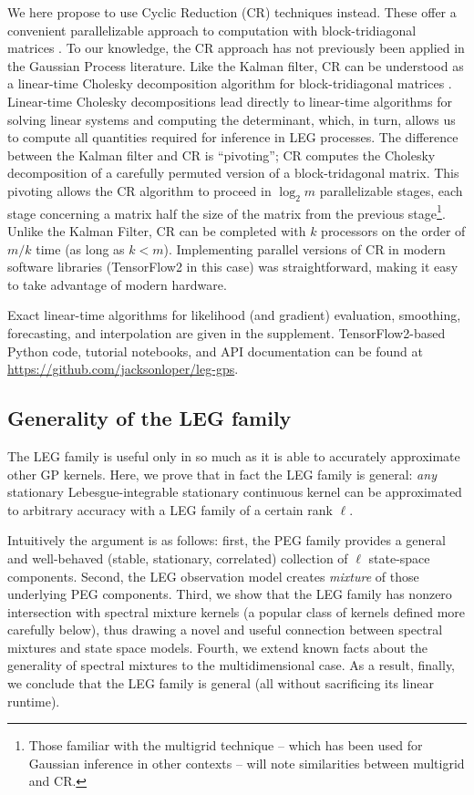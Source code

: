 \documentclass{article}
\theoremstyle{definition}
\begin{document}
We here propose to use Cyclic Reduction (CR) techniques instead.  These offer a convenient parallelizable approach to computation with block-tridiagonal matrices \cite{sweet1974generalized}.  To our knowledge, the CR approach has not previously been applied in the Gaussian Process literature. 
Like the Kalman filter, CR can be understood as a linear-time Cholesky decomposition algorithm for block-tridiagonal matrices \cite{eubank2002equivalence}.  Linear-time Cholesky decompositions lead directly to linear-time algorithms for solving linear systems and computing the determinant, which, in turn, allows us to compute all quantities required for inference in LEG processes. The difference between the Kalman filter and CR is ``pivoting''; CR computes the Cholesky decomposition of a carefully permuted version of a block-tridagonal matrix.  This pivoting allows the CR algorithm to proceed in $\log_2 m$ parallelizable stages, each stage concerning a matrix half the size of the matrix from the previous stage\footnote{Those familiar with the multigrid technique \cite{terzopoulos1986image,hackbusch2013multi} -- which has been used for Gaussian inference in other contexts \cite{papandreou2010gaussian,mukadam2016gaussian,zanella2017analysis} -- will note similarities between multigrid and CR.}.   Unlike the Kalman Filter, CR can be completed with $k$ processors on the order of $m/k$ time (as long as $k<m$).   Implementing parallel versions of CR in modern software libraries (TensorFlow2 in this case) was straightforward, making it easy to take advantage of modern hardware.  

Exact linear-time algorithms for likelihood (and gradient) evaluation, smoothing, forecasting, and interpolation are given in the supplement.  TensorFlow2-based Python code, tutorial  notebooks, and API documentation can be found at \url{https://github.com/jacksonloper/leg-gps}. 

\subsection{Generality of the LEG family}
\label{sec:smk}
The LEG family is useful only in so much as it is able to accurately approximate other GP kernels.  Here, we prove that in fact the LEG family is general: \emph{any} stationary Lebesgue-integrable stationary continuous kernel can be approximated to arbitrary accuracy with a LEG family of a certain rank $\ell$.  

Intuitively the argument is as follows: first, the PEG family provides a general and well-behaved (stable, stationary, correlated) collection of $\ell$ state-space components.  Second, the LEG observation model creates 
\emph{mixture} 
of those underlying PEG components.  Third, we show that the LEG family has nonzero intersection with spectral mixture kernels (a popular class of kernels defined more carefully below), thus drawing a novel and useful connection between spectral mixtures and state space models. Fourth, we extend known facts about the generality of spectral mixtures to the multidimensional case.  As a result, finally, we conclude that the LEG family is general (all without sacrificing its linear runtime).
\end{document}
